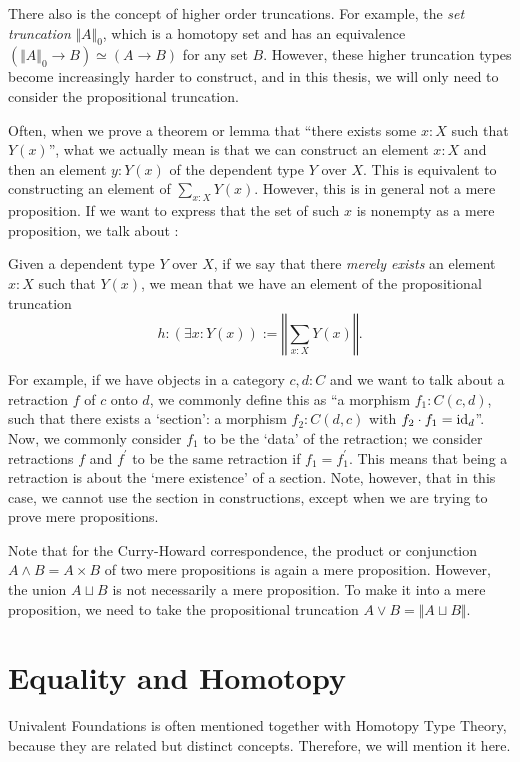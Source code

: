 There also is the concept of higher order truncations. For example, the \textit{set truncation} $ \Vert A \Vert_0 $, which is a homotopy set and has an equivalence $ (\Vert A \Vert_0 \to B) \simeq (A \to B) $ for any set $ B $. However, these higher truncation types become increasingly harder to construct, and in this thesis, we will only need to consider the propositional truncation.

Often, when we prove a theorem or lemma that ``there exists some $ x: X $ such that $ Y(x) $'', what we actually mean is that we can construct an element $ x: X $ and then an element $ y : Y(x) $ of the dependent type $ Y $ over $ X $. This is equivalent to constructing an element of $ \sum_{x: X} Y(x) $. However, this is in general not a mere proposition. If we want to express that the set of such $ x $ is nonempty as a mere proposition, we talk about :
\begin{definition}\label{def:mere-existence}
  Given a dependent type $ Y $ over $ X $, if we say that there \textit{merely exists} an element $ x: X $ such that $ Y(x) $, we mean that we have an element of the propositional truncation
  \[ h: \left(\exists x: Y(x)\right) := \left\Vert \sum_{x: X} Y(x) \right\Vert. \]
\end{definition}

For example, if we have objects in a category $ c, d: C $ and we want to talk about a retraction $ f $ of $ c $ onto $ d $, we commonly define this as ``a morphism $ f_1: C(c, d) $, such that there exists a `section': a morphism $ f_2: C(d, c) $ with $ f_2 \cdot f_1 = \text{id}_{d} $''. Now, we commonly consider $ f_1 $ to be the `data' of the retraction; we consider retractions $ f $ and $ f^\prime $ to be the same retraction if $ f_1 = f^\prime_1 $. This means that being a retraction is about the `mere existence' of a section. Note, however, that in this case, we cannot use the section in constructions, except when we are trying to prove mere propositions.

Note that for the Curry-Howard correspondence, the product or conjunction $ A \land B = A \times B $ of two mere propositions is again a mere proposition. However, the union $ A \sqcup B $ is not necessarily a mere proposition. To make it into a mere proposition, we need to take the propositional truncation $ A \lor B = \Vert A \sqcup B \Vert $.

\section{Equality and Homotopy}\label{sec:equality-homotopy}
Univalent Foundations is often mentioned together with Homotopy Type Theory, because they are related but distinct concepts. Therefore, we will mention it here.

